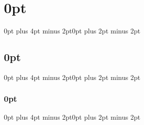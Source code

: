 \titlespacing\section{0pt}{0pt plus 4pt minus 2pt}{0pt plus 2pt minus 2pt}
\titlespacing\subsection{0pt}{0pt plus 4pt minus 2pt}{0pt plus 2pt minus 2pt}
\titlespacing\subsubsection{0pt}{0pt plus 4pt minus 2pt}{0pt plus 2pt minus 2pt}

\usepackage{etoolbox}
\makeatletter
\patchcmd{\ps@plain}{\thepage}{\sffamily\thepage}{}{}
\makeatother
\pagestyle{plain}

\usepackage{enumitem}
\renewcommand{\labelitemi}{-}